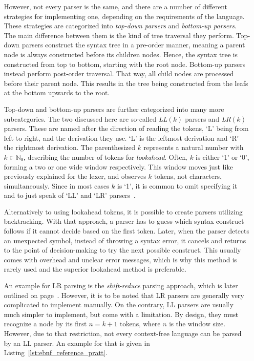However, not every parser is the same, and there are a number of different strategies for implementing one, depending on the requirements of the language.
These strategies are categorized into \emph{top-down parsers} and \emph{bottom-up parsers}.
The main difference between them is the kind of tree traversal they perform.
Top-down parsers construct the syntax tree in a pre-order manner, meaning a parent node is always constructed before its children nodes.
Hence, the syntax tree is constructed from top to bottom, starting with the root node.
Bottom-up parsers instead perform post-order traversal.
That way, all child nodes are processed before their parent node.
This results in the tree being constructed from the leafs at the bottom upwards to the root.

Top-down and bottom-up parsers are further categorized into many more subcategories.
The two discussed here are so-called \emph{LL$(k)$} parsers and \emph{LR$(k)$} parsers.
These are named after the direction of reading the tokens, `L' being from left to right, and the derivation they use.
`L' is the leftmost derivation and `R' the rightmost derivation.
The parenthesized $k$ represents a natural number with $k\in\mathbb{N}_0$, describing the number of tokens for \emph{lookahead}.
Often, $k$ is either `1' or `0', forming a two or one wide window respectively.
This window moves just like previously explained for the lexer, and observes $k$ tokens, not characters, simultaneously.
Since in most cases $k$ is `1', it is common to omit specifying it and to just speak of `LL' and `LR' parsers~\cite[pp.86-88]{Watson2017}.

Alternatively to using lookahead tokens, it is possible to create parsers utilizing backtracking.
With that approach, a parser has to guess which syntax construct follows if it cannot decide based on the first token.
Later, when the parser detects an unexpected symbol, instead of throwing a syntax error, it cancels and returns to the point of decision-making to try the next possible construct.
This usually comes with overhead and unclear error messages, which is why this method is rarely used and the superior lookahead method is preferable.

An example for LR parsing is the \emph{shift-reduce} parsing approach, which is later outlined on page~\pageref{sec:parser_generators}.
However, it is to be noted that LR parsers are generally very complicated to implement manually.
On the contrary, LL parsers are usually much simpler to implement, but come with a limitation.
By design, they must recognize a node by its first $n=k+1$ tokens, where $n$ is the window size.
However, due to that restriction, not every context-free language can be parsed by an LL parser.
An example for that is given in Listing~\ref{lst:ebnf_reference_pratt}.

